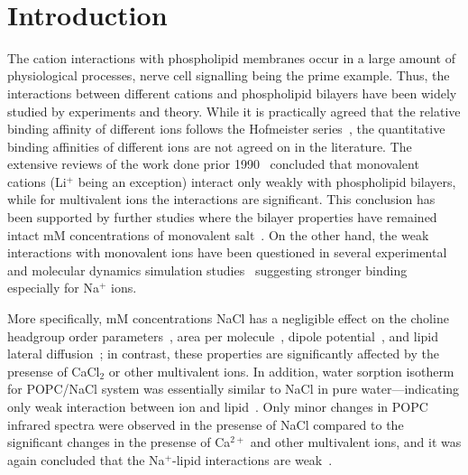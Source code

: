 \documentclass[pre,aps,floatfix,authordate1-4,twocolumn]{revtex4-1}
\begin{document}
\maketitle


~\vspace{0.3cm}\\
{\it \bf} 

\section{Introduction}

The cation interactions with phospholipid membranes occur in a large amount
of physiological processes, nerve cell signalling being the prime example.
Thus, the interactions between different cations and phospholipid bilayers have been widely studied by experiments
and theory. While it is practically agreed that the relative binding affinity of different
ions follows the Hofmeister series~\cite{eisenberg79,cevc90,tocanne90,binder02,celma07,leontidis09,vacha09a,klasczyk10,harb13}, the quantitative binding affinities of different
ions are not agreed on in the literature. The extensive reviews of the work done prior 1990~\cite{cevc90,tocanne90}
concluded that monovalent cations (Li$^+$ being an exception) interact only weakly with phospholipid bilayers, 
while for multivalent ions the interactions are significant. This conclusion has been supported by
further studies where the bilayer properties have remained intact mM concentrations of monovalent 
salt~\cite{binder02,pabst07,filippov09}. On the other hand, the weak interactions with monovalent ions
have been questioned in several experimental and molecular dynamics simulation 
studies~\cite{bockmann03,bockmann04,vacha09a,manyes05,manyes06,fukuma07,leontidis09,ferber11,morata12,klasczyk10,harb13}
suggesting stronger binding especially for Na$^{+}$ ions.

More specifically, mM concentrations NaCl has a negligible effect on the
choline headgroup order parameters~\cite{akutsu81}, area per molecule~\cite{pabst07}, dipole potential~\cite{clarke99},
and lipid lateral diffusion~\cite{filippov09}; in contrast, these properties are significantly affected by the presense
of CaCl$_2$ or other multivalent ions. In addition, water sorption isotherm for POPC/NaCl system
was essentially similar to NaCl in pure water---indicating only weak interaction between ion and lipid~\cite{binder02}.
Only minor changes in POPC infrared spectra were observed in the presense of NaCl compared to the significant 
changes in the presense of Ca$^{2+}$ and other multivalent ions, and it was again concluded that the Na$^+$-lipid interactions are weak~\cite{binder02}.
\end{document}
